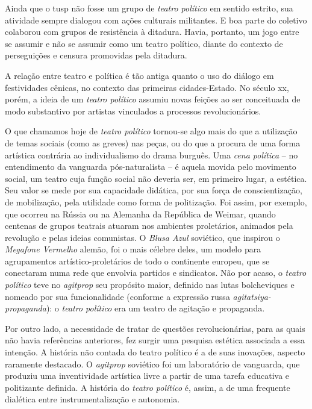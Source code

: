 \subject{Políticas do teatro}

Ainda que o {\sc tusp} não fosse um grupo de {\it teatro político} em sentido
estrito, sua atividade sempre dialogou
com ações culturais militantes. E boa parte do coletivo colaborou com
grupos de resistência à ditadura. Havia, portanto, um jogo entre se
assumir e não se assumir como um teatro político, diante do contexto de
perseguições e censura promovidas pela ditadura.

A relação entre teatro e política é tão antiga quanto o uso do diálogo
em festividades cênicas, no contexto das primeiras cidades-Estado. No
século {\sc xx}, porém, a ideia de um {\it teatro político} assumiu novas feições
ao ser conceituada de modo substantivo por artistas vinculados a processos revolucionários.

O que chamamos hoje de {\it teatro político} tornou-se algo mais do que
a utilização de temas sociais (como as greves) nas peças, ou do que a
procura de uma forma artística contrária ao individualismo do drama
burguês. Uma {\it cena política} -- no entendimento da vanguarda
pós-naturalista -- é aquela movida pelo movimento social, um teatro cuja
função social não deveria ser, em primeiro lugar, a estética. Seu valor
se mede por sua capacidade didática, por sua força de conscientização,
de mobilização, pela utilidade como forma de politização. Foi assim, por
exemplo, que ocorreu na Rússia ou na Alemanha da República de Weimar,
quando centenas de grupos teatrais atuaram nos ambientes proletários,
animados pela revolução e pelas ideias comunistas. O {\it Blusa Azul}
soviético, que inspirou o {\it Megafone Vermelho} alemão, foi o mais
célebre deles, um modelo para agrupamentos artístico-proletários de todo
o continente europeu, que se conectaram numa rede que envolvia partidos
e sindicatos. Não por acaso, o {\it teatro político} teve no
{\it agitprop} seu propósito maior, definido nas lutas bolcheviques e
nomeado por sua funcionalidade (conforme a expressão russa
{\it agitatsiya-propaganda}): o {\it teatro político} era um teatro de
agitação e propaganda.

Por outro lado, a necessidade de tratar de questões revolucionárias,
para as quais não havia referências anteriores, fez surgir uma pesquisa
estética associada a essa intenção. A história não contada do teatro
político é a de suas inovações, aspecto raramente destacado. O
{\it agitprop} soviético foi um laboratório de vanguarda, que produziu uma
inventividade artística livre a partir de uma tarefa educativa e
politizante definida. A história do {\it teatro político} é, assim, a de
uma frequente dialética entre instrumentalização e autonomia.

